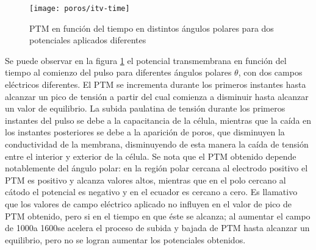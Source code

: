 \begin{figure}
	\texttt{[image: poros/itv-time]}
	\caption{PTM en función del tiempo en distintos ángulos polares para dos potenciales aplicados diferentes}
	\label{fig:itv-time}
\end{figure}



Se puede observar en la figura \ref{fig:itv-time} el potencial transmembrana en función del tiempo al comienzo del pulso para diferentes ángulos polares $\theta$, con dos campos eléctricos diferentes. El PTM se incrementa durante los primeros instantes hasta alcanzar un pico de tensión a partir del cual comienza a disminuir hasta alcanzar un valor de equilibrio. La subida paulatina de tensión durante los primeros instantes del pulso se debe a la capacitancia de la célula, mientras que la caída en los instantes posteriores se debe a la aparición de poros, que disminuyen la conductividad de la membrana, disminuyendo de esta manera la caída de tensión entre el interior y exterior de la célula. Se nota que el PTM obtenido depende notablemente del ángulo polar: en la región polar cercana al electrodo positivo el PTM es positivo y alcanza valores altos, mientras que en el polo cercano al cátodo el potencial es negativo y en el ecuador es cercano a cero. Es llamativo que los valores de campo eléctrico aplicado no influyen en el valor de pico de PTM obtenido, pero si en el tiempo en que éste se alcanza; al aumentar el campo de 1000\kvcm a 1600\kvcm se acelera el proceso de subida y bajada de PTM hasta alcanzar un equilibrio, pero no se logran aumentar los potenciales obtenidos.


